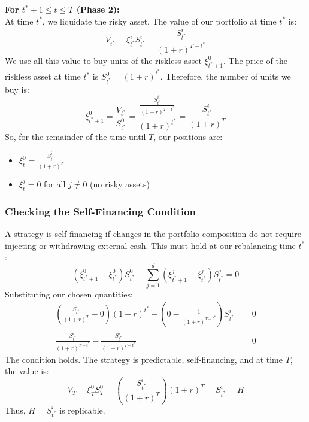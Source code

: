 \vspace{0.5em}
\noindent\textbf{For $t^*+1 \le t \le T$ (Phase 2):} \\
At time $t^*$, we liquidate the risky asset. The value of our portfolio at time $t^*$ is:
\begin{equation}
    V_{t^*} = \xi_{t^*}^i S_{t^*}^i = \frac{S_{t^*}^i}{(1+r)^{T-t^*}}
\end{equation}
We use all this value to buy units of the riskless asset $\xi_{t^*+1}^0$. The price of the riskless asset at time $t^*$ is $S_{t^*}^0 = (1+r)^{t^*}$. Therefore, the number of units we buy is:
\begin{equation}
    \xi_{t^*+1}^0 = \frac{V_{t^*}}{S_{t^*}^0} = \frac{\frac{S_{t^*}^i}{(1+r)^{T-t^*}}}{(1+r)^{t^*}} = \frac{S_{t^*}^i}{(1+r)^T}
\end{equation}
So, for the remainder of the time until $T$, our positions are:
\begin{itemize}
    \item $\xi_t^0 = \frac{S_{t^*}^i}{(1+r)^T}$
    \item $\xi_t^j = 0$ for all $j \ne 0$ (no risky assets)
\end{itemize}

\subsubsection*{Checking the Self-Financing Condition}
A strategy is self-financing if changes in the portfolio composition do not require injecting or withdrawing external cash. This must hold at our rebalancing time $t^*$:
\begin{equation}
    (\xi_{t^*+1}^0 - \xi_{t^*}^0) S_{t^*}^0 + \sum_{j=1}^d (\xi_{t^*+1}^j - \xi_{t^*}^j) S_{t^*}^j = 0
\end{equation}
Substituting our chosen quantities:
\begin{align}
    \left( \frac{S_{t^*}^i}{(1+r)^T} - 0 \right) (1+r)^{t^*} + \left( 0 - \frac{1}{(1+r)^{T-t^*}} \right) S_{t^*}^i &= 0 \\
    \frac{S_{t^*}^i}{(1+r)^{T-t^*}} - \frac{S_{t^*}^i}{(1+r)^{T-t^*}} &= 0
\end{align}
The condition holds. The strategy is predictable, self-financing, and at time $T$, the value is:
\begin{equation}
    V_T = \xi_T^0 S_T^0 = \left( \frac{S_{t^*}^i}{(1+r)^T} \right) (1+r)^T = S_{t^*}^i = H
\end{equation}
Thus, $H = S_{t^*}^i$ is replicable.

